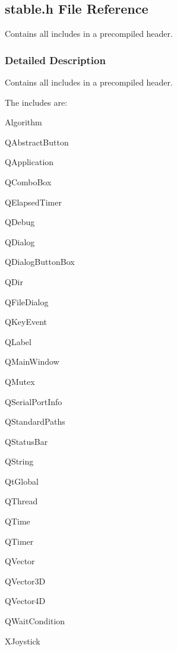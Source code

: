 \hypertarget{a00025}{}\subsection{stable.\+h File Reference}
\label{a00025}


Contains all includes in a precompiled header.  




\subsubsection{Detailed Description}
Contains all includes in a precompiled header. 

The includes are\+:
\begin{DoxyItemize}
\item Algorithm
\item Q\+Abstract\+Button
\item Q\+Application
\item Q\+Combo\+Box
\item Q\+Elapsed\+Timer
\item Q\+Debug
\item Q\+Dialog
\item Q\+Dialog\+Button\+Box
\item Q\+Dir
\item Q\+File\+Dialog
\item Q\+Key\+Event
\item Q\+Label
\item Q\+Main\+Window
\item Q\+Mutex
\item Q\+Serial\+Port\+Info
\item Q\+Standard\+Paths
\item Q\+Status\+Bar
\item Q\+String
\item Qt\+Global
\item Q\+Thread
\item Q\+Time
\item Q\+Timer
\item Q\+Vector
\item Q\+Vector3\+D
\item Q\+Vector4\+D
\item Q\+Wait\+Condition
\item X\+Joystick 
\end{DoxyItemize}